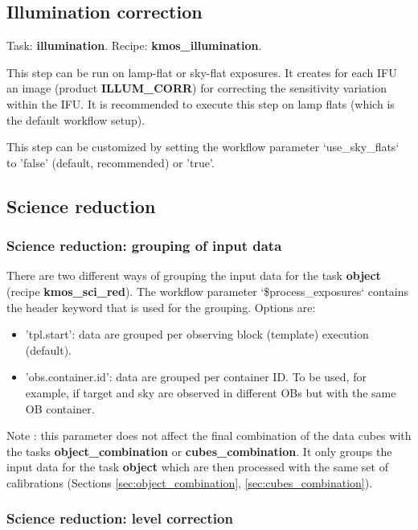 \subsection{Illumination correction}

Task: \textbf{illumination}. Recipe: \textbf{kmos\_illumination}. 

This step can be run on lamp-flat or sky-flat exposures. It creates for each IFU an image
(product \textbf{ILLUM\_CORR}) for correcting the
sensitivity variation within the IFU. It is recommended to execute this step on lamp flats (which is the
default workflow setup).

This step can be customized by setting the workflow parameter `use\_sky\_flats` to 'false' (default, recommended) or 
'true'.




\subsection{Science reduction}
\subsubsection{Science reduction: grouping of input data}

There are two different ways of grouping the input data for the task \textbf{object} (recipe \textbf{kmos\_sci\_red}).
The workflow parameter `\$process\_exposures` contains the header keyword that is used for the grouping.
Options are:
\begin{itemize}
\item 'tpl.start': data are grouped per observing block (template) execution (default).
\item 'obs.container.id': data are grouped per container ID. To be used, for example,
if target and sky are observed in different OBs but with the same OB container.
\end{itemize}

Note : this parameter does not affect the final combination of the data cubes with the tasks \textbf{object\_combination} or
\textbf{cubes\_combination}. It only groups the input data for the task \textbf{object} which are then processed
with the same set of calibrations (Sections \ref{sec:object_combination}, \ref{sec:cubes_combination}).

 

\subsubsection{Science reduction: level correction}

